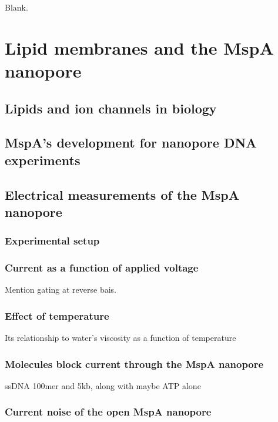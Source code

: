\begin{savequote}[75mm]
Blank.
\end{savequote}

\chapter{Lipid membranes and the MspA nanopore}
\label{2_lipids_mspa}

\section{Lipids and ion channels in biology}

\section{MspA's development for nanopore DNA experiments}

\section{Electrical measurements of the MspA nanopore}

\subsection{Experimental setup}

\subsection{Current as a function of applied voltage}

Mention gating at reverse bais.

\subsection{Effect of temperature}

Its relationship to water's viscosity as a function of temperature

\subsection{Molecules block current through the MspA nanopore}

ssDNA 100mer and 5kb, along with maybe ATP alone

\subsection{Current noise of the open MspA nanopore}